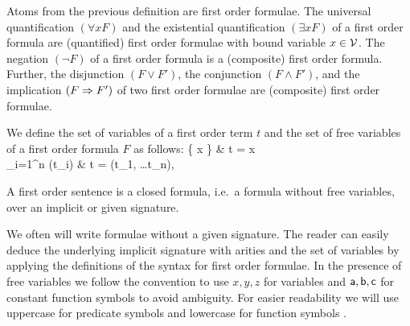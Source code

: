 
\begin{definition}\label{def:syntax:FOF}
	Atoms from the previous definition are {\myem first order formulae}.  
	The universal quantification $(\forall x F)$ 
	and the existential quantification $(\exists x F)$ 
	of a first order formula are (quantified) first order formulae
	with {\myem bound} variable $x\in{\mathcal V}$.
	The negation $(\lnot F)$ of a first order formula
	is a (composite) first order formula.
	Further, the disjunction $(F \lor F')$, 
	the conjunction $(F \land F') $, 
	and the implication $(F \Rightarrow F')$ 
	of two first order formulae
	are (composite) first order formulae.
\end{definition}

\begin{definition}\label{def:term:vars}\label{def:fof:fvars}\label{def:fof:sentence}
	We define the set of variables of a first order term $t$ and the set of {\myem free} variables of a first order formula $F$ as follows:
 {
		\{ x \} &  t = x \in \mcV \\
		\bigcup_{i=1}^n \var(t_i) &   t = \mf(t_1, \ldots t_n), \mf \in \mcFfn
	}

\noindent A first order {\myem sentence} is a closed formula, 
i.e.~a formula without free variables, 
over an implicit or given signature.
\end{definition}

\begin{remark} We often will write formulae without a given signature.
The reader can easily deduce the underlying {\myem implicit} signature with arities and the set of variables
by applying the definitions of the syntax for first order formulae.
In the presence of free variables we follow the convention to use $x,y,z$ for variables 
and ${\mathsf a},{\mathsf b},{\mathsf c}$ for constant function symbols to avoid ambiguity. 
For easier readability we will use uppercase for predicate symbols and lowercase for function symbols .
\end{remark}